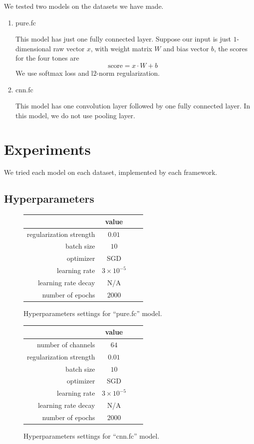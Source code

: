 \documentclass[a4paper]{article}
\begin{document}
We tested two models on the datasets we have made.
\begin{enumerate}
\item pure.fc

	This model has just one fully connected layer. Suppose our input is just $1$-dimensional raw vector $x$, with weight matrix $W$ and bias vector $b$, the scores for the four tones are
	\[
		\text{score} = x \cdot W + b
	\]
	We use softmax loss and l$2$-norm regularization.

\item cnn.fc

	This model has one convolution layer followed by one fully connected layer. In this model, we do not use pooling layer.

\end{enumerate}

\section{Experiments}

We tried each model on each dataset, implemented by each framework.

\subsection{Hyperparameters}

\begin{figure}[H]
\centering
\begin{tabular}{|r|c|c|c|}
\hline
 & value \\
\hline
regularization strength & $0.01$ \\
\hline
batch size & $10$ \\
\hline
optimizer & SGD \\
\hline
learning rate & $3\times10^{-5}$\\
\hline
learning rate decay & N/A \\
\hline
number of epochs & $2000$ \\
\hline
\end{tabular}
\caption{Hyperparameters settings for ``pure.fc'' model.}
\end{figure}

\begin{figure}[H]
\centering
\begin{tabular}{|r|c|c|c|}
\hline
 & value \\
\hline
number of channels & $64$ \\
\hline
regularization strength & $0.01$ \\
\hline
batch size & $10$ \\
\hline
optimizer & SGD \\
\hline
learning rate & $3\times10^{-5}$\\
\hline
learning rate decay & N/A \\
\hline
number of epochs & $2000$ \\
\hline
\end{tabular}
\caption{Hyperparameters settings for ``cnn.fc'' model.}
\end{figure}
\end{document}

